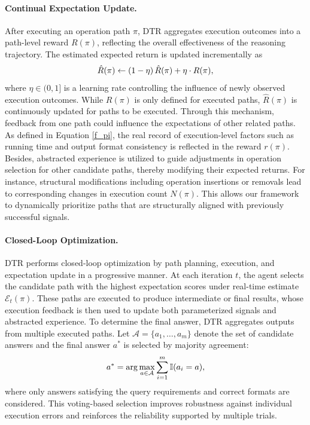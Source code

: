 \paragraph{Continual Expectation Update.}
After executing an operation path $\pi$, DTR aggregates execution outcomes into a path-level reward $R(\pi)$, reflecting the overall effectiveness of the reasoning trajectory. The estimated expected return is updated incrementally as
\begin{equation}\small
\hat{R}(\pi) \leftarrow (1-\eta)\,\hat{R}(\pi) + \eta \cdot R(\pi),
\vspace{-1mm}
\end{equation}
where $\eta \in (0,1]$ is a learning rate controlling the influence of newly observed execution outcomes. While $R(\pi)$ is only defined for executed paths, $\hat{R}(\pi)$ is continuously updated for paths to be executed. Through this mechanism, feedback from one path could influence the expectations of other related paths. As defined in Equation \ref{f_pi}, the real record of execution-level factors such as running time and output format consistency is reflected in the reward $r(\pi)$. Besides, abstracted experience is utilized to guide adjustments in operation selection for other candidate paths, thereby modifying their expected returns. For instance, structural modifications including operation insertions or removals lead to corresponding changes in execution count $N(\pi)$. This allows our framework to dynamically prioritize paths that are structurally aligned with previously successful signals. 
\vspace{-4mm}
\paragraph{Closed-Loop Optimization.}
DTR performs closed-loop optimization by path planning, execution, and expectation update in a progressive manner. At each iteration $t$, the agent selects the candidate path with the highest expectation scores under real-time estimate $\mathcal{E}_t(\pi)$. These paths are executed to produce intermediate or final results, whose execution feedback is then used to update both parameterized signals and abstracted experience. To determine the final answer, DTR aggregates outputs from multiple executed paths.
Let $\mathcal{A} = \{a_1, \dots, a_m\}$ denote the set of candidate answers and the final answer $a^\ast$ is selected by majority agreement:
\vspace{-2mm}
\begin{equation}\small
a^\ast = \arg\max_{a \in \mathcal{A}} \sum_{i=1}^{m} \mathbb{I}(a_i = a),
\vspace{-2mm}
\end{equation}
where only answers satisfying the query requirements and correct formats are considered. This voting-based selection improves robustness against individual execution errors and reinforces the reliability supported by multiple trials.